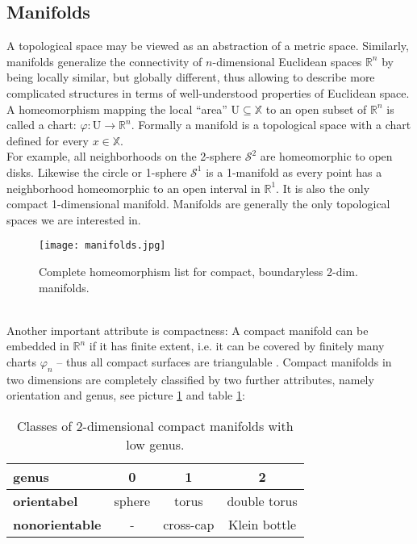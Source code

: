 \subsection{Manifolds}
\label{math_manifolds}

A topological space may be viewed as an abstraction of a metric space.
Similarly, manifolds generalize the connectivity of $n$-dimensional Euclidean spaces $\mathbb{R}^{n}$ by being locally similar, but globally different, thus allowing to describe more complicated structures in terms of well-understood properties of Euclidean space.
A homeomorphism mapping the local ``area'' $\mathrm{U} \subseteq \mathbb{X}$ to an open subset of $\mathbb{R}^{n}$ is called a chart: $\varphi : \mathrm{U} \rightarrow \mathbb{R}^{n}$.
Formally a manifold is a topological space with a chart defined for every $x \in \mathbb{X}$.\\
For example, all neighborhoods on the 2-sphere $\mathcal{S}^{2}$ are homeomorphic to open disks.
Likewise the circle or 1-sphere $\mathcal{S}^{1}$ is a 1-manifold as every point has a neighborhood homeomorphic to an open interval in $\mathbb{R}^{1}$.
It is also the only compact 1-dimensional manifold.
Manifolds are generally the only topological spaces we are interested in.
\begin{figure}[ht]
\centering
\texttt{[image: manifolds.jpg]}
\caption{Complete homeomorphism list for compact, boundaryless 2-dim. manifolds.}
\label{fig:manifolds}
\end{figure}\\
Another important attribute is compactness: A compact manifold can be embedded in $\mathbb{R}^{n}$ if it has finite extent, i.e. it can be covered by finitely many charts $\varphi_{n}$ -- thus all compact surfaces are triangulable \citep[which was first shown by][]{Rado1925}.
Compact manifolds in two dimensions are completely classified by two further attributes, namely orientation and genus, see picture \ref{fig:manifolds} and table \ref{tab:manifolds}:
\begin{table}[hbt]
\medskip
\setlength{\tabcolsep}{15pt}
\renewcommand{\arraystretch}{1.0}
   \centering
\begin{tabular}{ l || c | c | c } \centering
	\textbf{genus}		& 0			& 1				& 2 \\ \hline \hline
	\textbf{orientabel}	& sphere		& torus 			& double torus \\ \hline
	\textbf{nonorientable}	& -			& cross-cap		& Klein bottle \\
\end{tabular}
   \medskip
   \caption{Classes of 2-dimensional compact manifolds with low genus.}
   \label{tab:manifolds}
\end{table}\\
